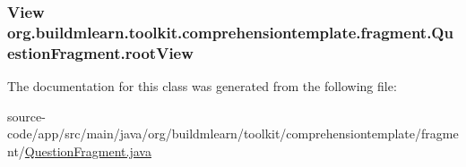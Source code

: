 \subsubsection[{\texorpdfstring{root\+View}{rootView}}]{\setlength{\rightskip}{0pt plus 5cm}View org.\+buildmlearn.\+toolkit.\+comprehensiontemplate.\+fragment.\+Question\+Fragment.\+root\+View\hspace{0.3cm}{\ttfamily [private]}}\hypertarget{classorg_1_1buildmlearn_1_1toolkit_1_1comprehensiontemplate_1_1fragment_1_1QuestionFragment_afea25d76857605e7164fc6d8e018681e}{}\label{classorg_1_1buildmlearn_1_1toolkit_1_1comprehensiontemplate_1_1fragment_1_1QuestionFragment_afea25d76857605e7164fc6d8e018681e}


The documentation for this class was generated from the following file\+:\begin{DoxyCompactItemize}
\item 
source-\/code/app/src/main/java/org/buildmlearn/toolkit/comprehensiontemplate/fragment/\hyperlink{comprehensiontemplate_2fragment_2QuestionFragment_8java}{Question\+Fragment.\+java}\end{DoxyCompactItemize}
